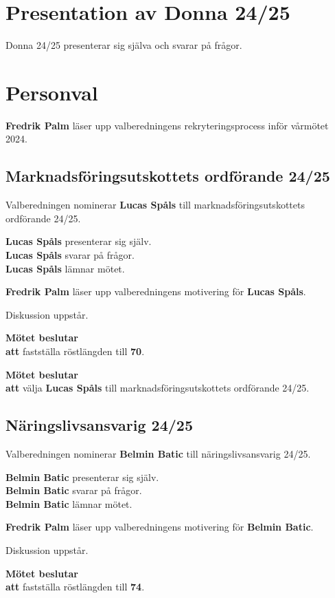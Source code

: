 \documentclass{datateknologsektionen-document}
\newcommand{\ind}{\hspace*{2em}}
\newcommand{\motetbeslutar}{\textbf{Mötet beslutar}}
\newcommand{\att}{\\\ind\textbf{att}}
\newcommand{\rostlangd}[1]{\motetbeslutar\att{} fastställa röstlängden till \textbf{#1}.}
\begin{document}
\section{Presentation av Donna 24/25}

Donna 24/25 presenterar sig själva och svarar på frågor.

\section{Personval}

\textbf{Fredrik Palm} läser upp valberedningens rekryteringsprocess inför vårmötet 2024.

\subsection{Marknadsföringsutskottets ordförande 24/25}

Valberedningen nominerar \textbf{Lucas Spåls} till marknadsföringsutskottets ordförande 24/25.

\textbf{Lucas Spåls} presenterar sig själv.\\
\textbf{Lucas Spåls} svarar på frågor.\\
\textbf{Lucas Spåls} lämnar mötet.

\textbf{Fredrik Palm} läser upp valberedningens motivering för \textbf{Lucas Spåls}.

Diskussion uppstår.

\rostlangd{70}

\motetbeslutar\att{} välja \textbf{Lucas Spåls} till marknadsföringsutskottets ordförande 24/25.

\subsection{Näringslivsansvarig 24/25}

Valberedningen nominerar \textbf{Belmin Batic} till näringslivsansvarig 24/25.

\textbf{Belmin Batic} presenterar sig själv.\\
\textbf{Belmin Batic} svarar på frågor.\\
\textbf{Belmin Batic} lämnar mötet.

\textbf{Fredrik Palm} läser upp valberedningens motivering för \textbf{Belmin Batic}.

Diskussion uppstår.

\rostlangd{74}
\end{document}
